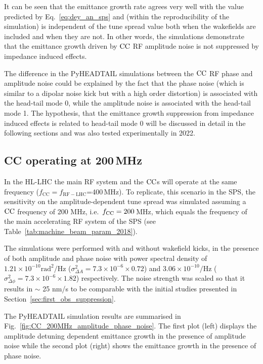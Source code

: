  It can be seen that the emittance growth rate agrees very well with the value predicted by Eq.~\eqref{eq:dey_an_sps} and (within the reproducibility of the simulation) is independent of the tune spread value both when the wakefields are included and when they are not. In other words, the simulations demonstrate that the emittance growth driven by ${\mathrm{CC}}$ RF amplitude noise is not suppressed by impedance induced effects. 

 The difference in the PyHEADTAIL simulations between the ${\mathrm{CC}}$ RF phase and amplitude noise could be explained by the fact that the phase noise (which is similar to a dipolar noise kick but with a high order distortion) is associated with the head-tail mode 0, while the amplitude noise is associated with the head-tail mode 1. The hypothesis, that the emittance growth suppression from impedance induced effects is related to head-tail mode 0 will be discussed in detail in the following sections and was also tested experimentally in 2022.


\subsection{CC operating at 200\,MHz}\label{subsec:fcc_200MHz}
In the HL-LHC the main RF system and the ${\mathrm{CC}}$s will operate at the same frequency ($f_\mathrm{CC}=f_\mathrm{RF-LHC}$=400\,MHz). To replicate, this scenario in the SPS, the sensitivity on the amplitude-dependent tune spread was simulated assuming a ${\mathrm{CC}}$ frequency of 200 MHz, i.e.~${f_\mathrm{CC}}=200$\,MHz, which equals the frequency of the main accelerating RF system of the SPS (see Table~\ref{tab:machine_beam_param_2018}). 

The simulations were performed with and without wakefield kicks, in the presence of both amplitude and phase noise with power spectral density of $1.21 \times 10^{-10} \mathrm{rad^2/Hz}$ ($\sigma_{\Delta A}^2=7.3 \times 10^{-6} \times 0.72$) and $3.06 \times 10^{-10} \mathrm{/Hz}$ ($\sigma_{\Delta \phi}^2=7.3 \times 10^{-6} \times 1.82$) respectively. The noise strength was scaled so that it results in $\sim$ 25 nm/s to be comparable with the initial studies presented in Section~\ref{sec:first_obs_suppression}.

The PyHEADTAIL simulation results are summarised in Fig.~\ref{fig:CC_200MHz_amplitude_phase_noise}. The first plot (left) displays the amplitude detuning dependent emittance growth in the presence of amplitude noise while the second plot (right) shows the emittance growth in the presence of phase noise. 


